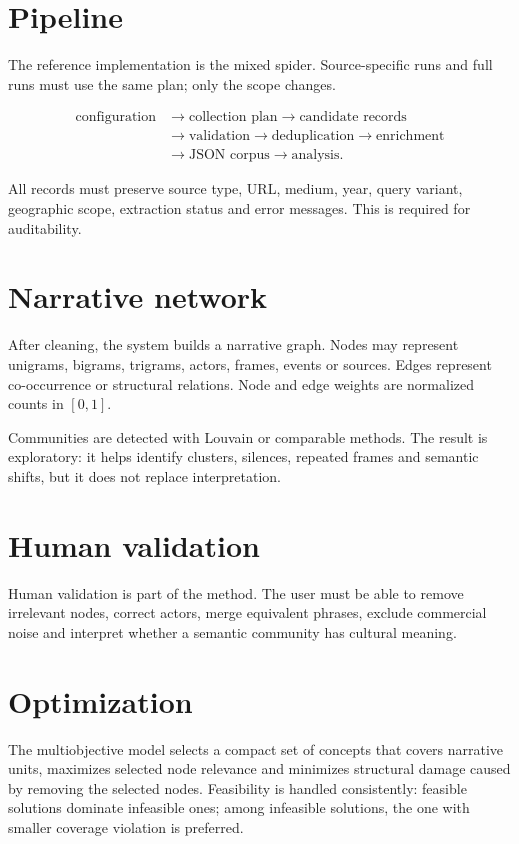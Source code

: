 \documentclass[11pt]{article}
\begin{document}
\section{Pipeline}

The reference implementation is the mixed spider. Source-specific runs and full runs must use the same plan; only the scope changes.

\[
\begin{aligned}
\text{configuration} &\rightarrow \text{collection plan}
\rightarrow \text{candidate records}\\
&\rightarrow \text{validation}
\rightarrow \text{deduplication}
\rightarrow \text{enrichment}\\
&\rightarrow \text{JSON corpus}
\rightarrow \text{analysis}.
\end{aligned}
\]

All records must preserve source type, URL, medium, year, query variant, geographic scope, extraction status and error messages. This is required for auditability.

\section{Narrative network}

After cleaning, the system builds a narrative graph. Nodes may represent unigrams, bigrams, trigrams, actors, frames, events or sources. Edges represent co-occurrence or structural relations. Node and edge weights are normalized counts in $[0,1]$.

Communities are detected with Louvain or comparable methods. The result is exploratory: it helps identify clusters, silences, repeated frames and semantic shifts, but it does not replace interpretation.

\section{Human validation}

Human validation is part of the method. The user must be able to remove irrelevant nodes, correct actors, merge equivalent phrases, exclude commercial noise and interpret whether a semantic community has cultural meaning.

\section{Optimization}

The multiobjective model selects a compact set of concepts that covers narrative units, maximizes selected node relevance and minimizes structural damage caused by removing the selected nodes. Feasibility is handled consistently: feasible solutions dominate infeasible ones; among infeasible solutions, the one with smaller coverage violation is preferred.
\end{document}
